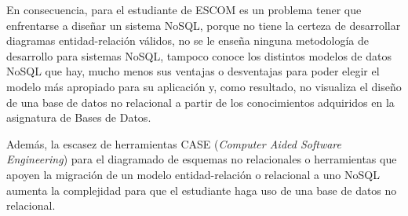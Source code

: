 En consecuencia, para el estudiante de ESCOM es un problema tener que enfrentarse a diseñar un sistema NoSQL, porque no tiene la certeza de desarrollar diagramas entidad-relación válidos, no se le enseña ninguna metodología de desarrollo para sistemas NoSQL, tampoco conoce los distintos modelos de datos NoSQL que hay, mucho menos sus ventajas o desventajas para poder elegir el modelo más apropiado para su aplicación y, como resultado, no visualiza el diseño de una base de datos no relacional a partir de los conocimientos adquiridos en la asignatura de Bases de Datos.


Además, la escasez de herramientas CASE (\textit{Computer Aided Software Engineering}) para el diagramado de esquemas no relacionales o herramientas que apoyen la migración de un modelo entidad-relación o relacional a uno NoSQL aumenta la complejidad para que el estudiante haga uso de una base de datos no relacional.
